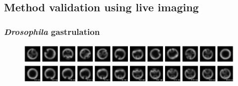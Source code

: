 \documentclass[twocolumn, 10pt]{article}
\begin{document}
\subsection*{Method validation using live imaging}

\subsubsection*{{\em Drosophila} gastrulation}

\begin{figure}[t]
\includegraphics[width=17cm]{drosophila_live_imaging_scrambled}

\includegraphics[width=17cm]{drosophila_live_imaging_ordered}


\end{figure}
\end{document}
